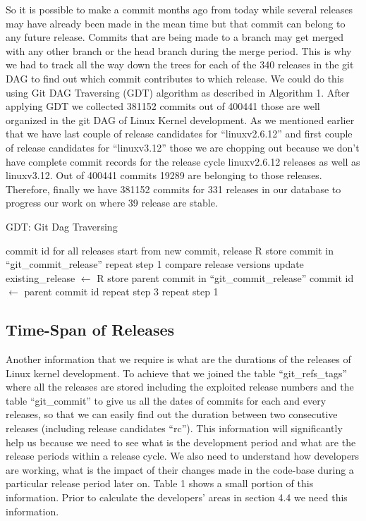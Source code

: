 \documentclass{acm_proc_article-sp}
\begin{document}
So it is possible to make a commit months ago from today while several releases may have already been made in the mean time but that commit can belong to any future release. Commits that are being made to a branch may get merged with any other branch or the head branch during the merge period. This is why we had to track all the way down the trees for each of the 340 releases in the git DAG to find out which commit contributes to which release. We could do this using Git DAG Traversing (GDT) algorithm as described in Algorithm 1. After applying GDT we collected 381152 commits out of 400441 those are well organized in the git DAG of Linux Kernel development. As we mentioned earlier that we have last couple of release candidates for ``linuxv2.6.12'' and first couple of release candidates for ``linuxv3.12'' those we are chopping out because we don't have complete commit records for the release cycle linuxv2.6.12 releases as well as linuxv3.12. Out of 400441 commits 19289 are belonging to those releases. Therefore, finally we have 381152 commits for 331 releases in our database to progress our work on where 39 release are stable.
\begin{algorithm}
\caption{GDT: Git Dag Traversing}
\begin{algorithmic}[1]
\REQUIRE
\STATE commit id for all releases
\ENSURE
{}
\STATE start from new commit, release R
\STATE store commit in ``git\_commit\_release''
			\STATE repeat step 1
			\STATE compare release versions
				\STATE update existing\_release $\gets$ R
			\ENDIF
		\ELSE
			\STATE store parent commit in ``git\_commit\_release''
			\STATE commit id $\gets$ parent commit id
			\STATE repeat step 3
		\ENDIF
	\ENDFOR
{}
	\STATE repeat step 1
\ENDIF
\ENDFOR
\end{algorithmic}
\end{algorithm}
\subsection{Time-Span of Releases}
Another information that we require is what are the durations of the releases of Linux kernel development. To achieve that we joined the table ``git\_refs\_tags'' where all the releases are stored including the exploited release numbers and the table ``git\_commit'' to give us all the dates of commits for each and every releases, so that we can easily find out the duration between two consecutive releases (including release candidates ``rc''). This information will significantly help us because we need to see what is the development period and what are the release periods within a release cycle. We also need to understand how developers are working, what is the impact of their changes made in the code-base during a particular release period later on. Table 1 shows a small portion of this information. Prior to calculate the developers' areas in section 4.4 we need this information.
\end{document}

